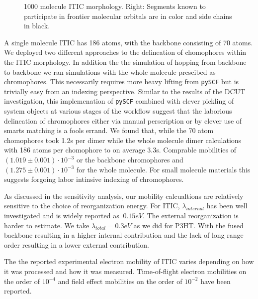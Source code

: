 \begin{figure}
\begin{subfigure}{.5\textwidth}
\end{subfigure}
    \caption[short]{1000 molecule ITIC morphology. Right: Segments known to participate in frontier
    molecular orbitals are in color and side chains in black.}
\label{ITIC}
\end{figure}

A single molecule ITIC has 186 atoms, with the backbone consisting of 70 atoms. We deployed two different
approaches to the delineation of chomophores within the ITIC morphology. In addition the the simulation of hopping
from backbone to backbone we ran simulations with the whole molecule prescibed as chromophores. This
necessarily requires more heavy lifting from \texttt{pySCF} but is trivially easy from an indexing perspective. Similar to the results of the DCUT
investigation, this implemenation of \texttt{pySCF} combined with clever pickling of system objects at various stages
of the workflow suggest that the laborious delineation of chromophores either via manual perscription or
by clever use of smarts matching is a fools errand. We found that, while the 70 atom chomophores took 1.2s
per dimer while the whole molecule dimer calculations with 186 atoms per chomophore to on average 3.3s.
Comprable mobilities of $(1.019 \pm 0.001)\cdot 10^{-3}$ or the backbone chromophores and 
$(1.275 \pm 0.001)\cdot 10^{-3}$ for the whole molecule. 
For small molecule materials this suggests forgoing labor intinsive indexing of chromophores.

As discussed in the sensitivity analysis, our mobility calcualtions are relatively sensitive to the choice of
reorganization energy. For ITIC, $\lambda_{internal}$ has been well investigated and is widely reported as
$~0.15eV$. The external reorganization is harder to estimate. We take $\lambda_{total}=0.3eV$ as we did for
P3HT. With the fused
backbone resulting in a higher internal contribution and the lack of long range order resulting in a lower
external contribution. 

The the reported
experimental electron mobility of ITIC varies depending on how it was processed and how it was measured. 
Time-of-flight electron mobilities on the order of $10^{-4}$ \cite{Mica2018} and field effect mobilities on the order of
$10^{-2}$ \cite{Park2018} have been reported. 


